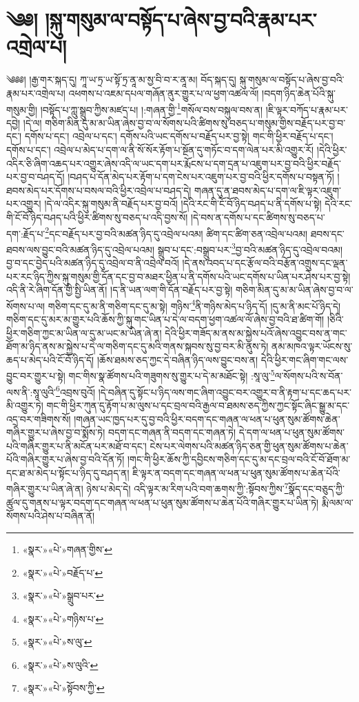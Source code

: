 \chapter{༄༅། །སྐུ་གསུམ་ལ་བསྟོད་པ་ཞེས་བྱ་བའི་རྣམ་པར་འགྲེལ་པ།}༄༅༅། །རྒྱ་གར་སྐད་དུ། ཀཱ་ཡ་ཏྲ་ཡ་སྟོ་ཏྲ་ནཱ་མ་སྱ་བི་བ་ར་ནཱ་མ། བོད་སྐད་དུ། སྐུ་གསུམ་ལ་བསྟོད་པ་ཞེས་བྱ་བའི་རྣམ་པར་འགྲེལ་པ། འཕགས་པ་འཇམ་དཔལ་གཞོན་ནུར་གྱུར་པ་ལ་ཕྱག་འཚལ་ལོ། །བདག་ཉིད་ཆེན་པོའི་སྐུ་གསུམ་གྱི། །བསྟོད་པ་ཀླུ་སྒྲུབ་ཀྱིས་མཛད་པ། །:གཞན་གྱི་\footnote{«སྣར་»«པེ་»གཞན་གྱིས་}གསོལ་བས་བསྐུལ་བས་ན། །ཇི་ལྟར་བཀོད་པ་རྣམ་པར་དབྱེ། །དེ་ལ། གཅིག་མིན་དུ་མ་མ་ཡིན་ཞེས་བྱ་བ་ལ་སོགས་པའི་ཚིགས་སུ་བཅད་པ་གསུམ་གྱིས་བརྗོད་པར་བྱ་བ་དང་། དགོས་པ་དང་། འབྲེལ་པ་དང་། དགོས་པའི་ཡང་དགོས་པ་བརྗོད་པར་བྱ་སྟེ། གང་གི་ཕྱིར་བརྗོད་པ་དང་། དགོས་པ་དང་། འབྲེལ་པ་མེད་པ་དག་ལ་ནི་སོ་སོར་རྟོག་པ་སྔོན་དུ་གཏོང་བ་དག་ལེན་པར་མི་འགྱུར་རོ། །དེའི་ཕྱིར་འདིར་ཅི་ཞིག་འཆད་པར་འགྱུར་ཞེས་འདི་ལ་ཡང་དག་པར་རྨོངས་པ་དག་དྲན་པ་འཇུག་པར་བྱ་བའི་ཕྱིར་བརྗོད་པར་བྱ་བ་བཤད་དོ། །བཤད་པ་དོན་མེད་པར་རྟོག་པ་དག་ངེས་པར་འཇུག་པར་བྱ་བའི་ཕྱིར་དགོས་པ་བསྟན་ཏོ། །ཐབས་མེད་པར་དོགས་པ་བསལ་བའི་ཕྱིར་འབྲེལ་པ་བཤད་དེ། གཞན་དུ་ན་ཐབས་མེད་པ་དག་ལ་ཇི་ལྟར་འཇུག་པར་འགྱུར། །དེ་ལ་འདིར་སྐུ་གསུམ་ནི་བརྗོད་པར་བྱ་བའོ། །དེའི་རང་གི་ངོ་བོ་ཉིད་བཤད་པ་ནི་དགོས་པ་སྟེ། དེའི་རང་གི་ངོ་བོ་ཉིད་བཤད་པའི་ཕྱིར་ཚིགས་སུ་བཅད་པ་འདི་བྱས་སོ། །དེ་བས་ན་དགོས་པ་དང་ཚིགས་སུ་བཅད་པ་དག་:རྗོད་པ་\footnote{«སྣར་»«པེ་»བརྗོད་པ་}དང་བརྗོད་པར་བྱ་བའི་མཚན་ཉིད་དུ་འབྲེལ་པའམ། ཚིག་དང་ཚིག་ཅན་འབྲེལ་པའམ། ཐབས་དང་ཐབས་ལས་བྱུང་བའི་མཚན་ཉིད་དུ་འབྲེལ་པའམ། སྒྲུབ་པ་དང་:བསྒྲུབ་པར་\footnote{«སྣར་»«པེ་»སྒྲུབ་པར་}བྱ་བའི་མཚན་ཉིད་དུ་འབྲེལ་བའམ། བྱ་བ་དང་བྱེད་པའི་མཚན་ཉིད་དུ་འབྲེལ་བ་ནི་འབྲེལ་བའོ། །དེ་ནས་འབད་པ་དང་རྩོལ་བའི་བརྩོན་འགྲུས་དང་ལྡན་པར་རང་ཉིད་ཀྱིས་སྐུ་གསུམ་གྱི་དོན་དང་བྱ་བ་མཐར་ཕྱིན་པ་ནི་དགོས་པའི་ཡང་དགོས་པ་ཡིན་པར་ཤེས་པར་བྱ་སྟེ། འདི་ནི་རེ་ཞིག་དོན་གྱི་སྤྱི་ཡིན་ནོ། །ད་ནི་ཡན་ལག་གི་དོན་བརྗོད་པར་བྱ་སྟེ། གཅིག་མིན་དུ་མ་མ་ཡིན་ཞེས་བྱ་བ་ལ་སོགས་པ་ལ། གཅིག་དང་དུ་མ་ནི་གཅིག་དང་དུ་མ་སྟེ། གཉིས་\footnote{«སྣར་»«པེ་»གཉིས་པ་}ནི་གཉིས་མེད་པ་ཉིད་དོ། །དུ་མ་ནི་མང་པོ་ཉིད་དེ། གཅིག་དང་དུ་མར་མ་གྱུར་པའི་ཆོས་ཀྱི་སྐུ་གང་ཡིན་པ་དེ་ལ་བདག་ཕྱག་འཚལ་ལོ་ཞེས་བྱ་བའི་ཐ་ཚིག་གོ། །ཅིའི་ཕྱིར་གཅིག་ཀྱང་མ་ཡིན་ལ་དུ་མ་ཡང་མ་ཡིན་ཞེ་ན། དེའི་ཕྱིར་གཟོད་མ་ནས་མ་སྐྱེས་པའོ་ཞེས་འབྱུང་བས་ན་གང་ཐོག་མ་ཉིད་ནས་མ་སྐྱེས་པ་དེ་ལ་གཅིག་དང་དུ་མའི་གནས་སྐབས་སུ་བྱ་བར་མི་ནུས་ཏེ། ནམ་མཁའ་ལྟར་ཡོངས་སུ་ཆད་པ་མེད་པའི་ངོ་བོ་ཉིད་དོ། །ཆོས་ཐམས་ཅད་ཀྱང་དེ་བཞིན་ཉིད་ལས་བྱུང་བས་ན། དེའི་ཕྱིར་གང་ཞིག་གང་ལས་བྱུང་བར་གྱུར་པ་སྟེ། གང་གིས་སྣ་ཚོགས་པའི་གཟུགས་སུ་གྱུར་པ་དེ་མ་མཐོང་སྟེ། :སཱ་ལུ་\footnote{«སྣར་»«པེ་»ས་ལུ་}ལ་སོགས་པའི་ས་བོན་ལས་ནི་:སཱ་ལུའི་\footnote{«སྣར་»«པེ་»ས་ལུའི་}འབྲས་བུའོ། །དེ་བཞིན་དུ་སྟོང་པ་ཉིད་ལས་གང་ཞིག་འབྱུང་བར་འགྱུར་བ་ནི་རྟག་པ་དང་ཆད་པར་མི་འགྱུར་ཏེ། གང་གི་ཕྱིར་ཀུན་དུ་རྟོག་པ་མ་ལུས་པ་དང་བྲལ་བའི་རྒྱལ་བ་ཐམས་ཅད་ཀྱིས་ཀྱང་སྟོང་ཞིང་སྒྱུ་མ་དང་འདྲ་བར་གཟིགས་སོ། །གཞན་ཡང་ཁྱད་པར་དུ་བྱ་བའི་ཕྱིར་བདག་དང་གཞན་ལ་ཕན་པ་ཕུན་སུམ་ཚོགས་ཆེན་གཞིར་གྱུར་པ་ཞེས་བྱ་བ་སྨོས་ཏེ། བདག་དང་གཞན་ནི་བདག་དང་གཞན་ཏེ། དེ་དག་ལ་ཕན་པ་ཕུན་སུམ་ཚོགས་པའི་གཞིར་གྱུར་པ་ནི་མངོན་པར་མཐོ་བ་དང་། ངེས་པར་ལེགས་པའི་མཚན་ཉིད་ཅན་གྱི་ཕུན་སུམ་ཚོགས་པ་ཆེན་པོའི་གཞིར་གྱུར་པ་ཞེས་བྱ་བའི་དོན་ཏོ། །གང་གི་ཕྱིར་ཆོས་ཀྱི་དབྱིངས་གཅིག་དང་དུ་མ་དང་བྲལ་བའི་ངོ་བོ་ཐོག་མ་དང་ཐ་མ་མེད་པ་སྟོང་པ་ཉིད་དུ་བཤད་ན། ཇི་ལྟར་ན་བདག་དང་གཞན་ལ་ཕན་པ་ཕུན་སུམ་ཚོགས་པ་ཆེན་པོའི་གཞིར་གྱུར་པ་ཡིན་ཞེ་ན། ཉེས་པ་མེད་དེ། འདི་ལྟར་མ་རིག་པའི་བག་ཆགས་ཀྱི་:སྟོབས་ཀྱིས་\footnote{«སྣར་»«པེ་»སྟོབས་ཀྱི་}སྣོད་དང་བཅུད་ཀྱི་ཚུལ་དུ་གནས་པ་ལྟར་བདག་དང་གཞན་ལ་ཕན་པ་ཕུན་སུམ་ཚོགས་པ་ཆེན་པོའི་གཞིར་གྱུར་པ་ཡིན་ཏེ། རྨི་ལམ་ལ་སོགས་པའི་ཤེས་པ་བཞིན་ནོ། 